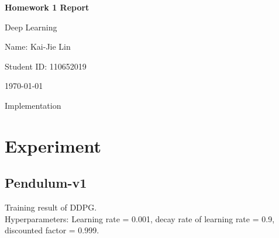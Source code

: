\documentclass{article} %
\newcommand{\question}[2][]{\begin{flushleft}\textbf{Question #1}: \textit{#2}\end{flushleft}}
\newcommand{\maketitletwo}[2][]{\begin{center}
        \Large{\textbf{Homework 1 Report}
        
            Deep Learning} %
        \vspace{5pt}
        
        \normalsize{
            Name: Kai-Jie Lin 
            
            Student ID: 110652019
            
            \today}
        \vspace{15pt}
        \end{center}}
\begin{document}
    \maketitletwo[5]  %
    \section{Implementation}
    \section{Experiment}
    \subsection{Pendulum-v1}
    Training result of DDPG. \\
    Hyperparameters: Learning rate = 0.001, decay rate of learning rate = 0.9, discounted factor = 0.999. \\
   
    
    
\end{document}
